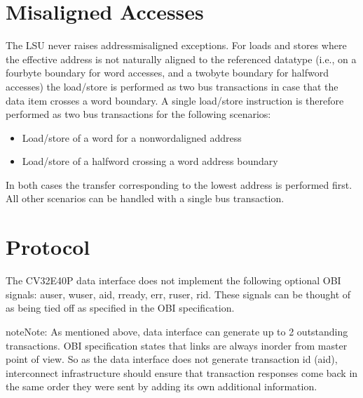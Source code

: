 \documentclass[letterpaper,10pt,english]{sphinxmanual}
\begin{document}
\section{Misaligned Accesses}
\label{\detokenize{load_store_unit:misaligned-accesses}}
\sphinxAtStartPar
The LSU never raises address\sphinxhyphen{}misaligned exceptions. For loads and stores where the effective address is not naturally aligned to the referenced
datatype (i.e., on a four\sphinxhyphen{}byte boundary for word accesses, and a two\sphinxhyphen{}byte boundary for halfword accesses) the load/store is performed as two
bus transactions in case that the data item crosses a word boundary. A single load/store instruction is therefore performed as two bus
transactions for the following scenarios:
\begin{itemize}
\item {} 
\sphinxAtStartPar
Load/store of a word for a non\sphinxhyphen{}word\sphinxhyphen{}aligned address

\item {} 
\sphinxAtStartPar
Load/store of a halfword crossing a word address boundary

\end{itemize}

\sphinxAtStartPar
In both cases the transfer corresponding to the lowest address is performed first. All other scenarios can be handled with a single bus transaction.


\section{Protocol}
\label{\detokenize{load_store_unit:protocol}}
\sphinxAtStartPar
The CV32E40P data interface does not implement the following optional OBI signals: auser, wuser, aid, rready, err, ruser, rid.
These signals can be thought of as being tied off as specified in the OBI specification.

\begin{sphinxadmonition}{note}{Note:}
\sphinxAtStartPar
{}
As mentioned above, data interface can generate up to 2 outstanding transactions.
OBI specification states that links are always in\sphinxhyphen{}order from master point of view. So as the data interface does not generate transaction id (aid),
interconnect infrastructure should ensure that transaction responses come back in the same order they were sent by adding its own additional information.
\end{sphinxadmonition}
\end{document}
